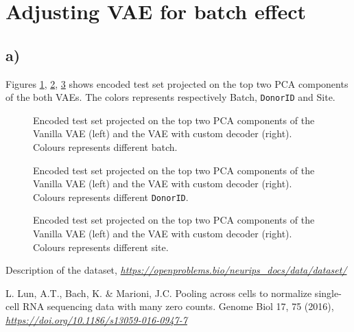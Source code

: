 \documentclass[a4paper,11pt]{article}
\begin{document}
\section{Adjusting VAE for batch effect}
\subsection*{a)}
Figures \ref{VAE:PCAbatch}, \ref{VAE:PCADonorID}, \ref{VAE:PCASite} shows encoded test set projected on the top two PCA components of the both VAEs. The colors represents respectively Batch, \texttt{DonorID} and Site.
\begin{figure}[H]
    \centering
    \qquad
    \caption{Encoded test set projected on the top two PCA components of the Vanilla VAE (left) and the VAE with custom decoder (right). Colours represents different batch.}%
    \label{VAE:PCAbatch}
\end{figure}
\begin{figure}[H]
    \centering
    \qquad
    \caption{Encoded test set projected on the top two PCA components of the Vanilla VAE (left) and the VAE with custom decoder (right). Colours represents different \texttt{DonorID}.}%
    \label{VAE:PCADonorID}
\end{figure}
\begin{figure}[H]
    \centering
    \qquad
    \caption{Encoded test set projected on the top two PCA components of the Vanilla VAE (left) and the VAE with custom decoder (right). Colours represents different site.}%
    \label{VAE:PCASite}
\end{figure}

\begin{thebibliography}{9}

    Description of the dataset,
    \emph{\href{https://openproblems.bio/neurips_docs/data/dataset/}{https://openproblems.bio/neurips\_docs/data/dataset/}}

    L. Lun, A.T., Bach, K. \& Marioni, J.C. Pooling across cells to normalize 
    single-cell RNA sequencing data with many zero counts. Genome Biol 17, 75 (2016),
    \emph{\href{https://doi.org/10.1186/s13059-016-0947-7}{https://doi.org/10.1186/s13059-016-0947-7}}

\end{thebibliography}
\end{document}
